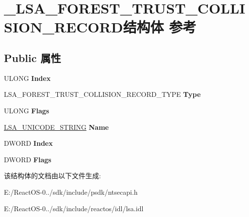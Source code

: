 \hypertarget{struct___l_s_a___f_o_r_e_s_t___t_r_u_s_t___c_o_l_l_i_s_i_o_n___r_e_c_o_r_d}{}\section{\+\_\+\+L\+S\+A\+\_\+\+F\+O\+R\+E\+S\+T\+\_\+\+T\+R\+U\+S\+T\+\_\+\+C\+O\+L\+L\+I\+S\+I\+O\+N\+\_\+\+R\+E\+C\+O\+R\+D结构体 参考}
\label{struct___l_s_a___f_o_r_e_s_t___t_r_u_s_t___c_o_l_l_i_s_i_o_n___r_e_c_o_r_d}
\subsection*{Public 属性}
\begin{DoxyCompactItemize}
\item 
\mbox{\label{struct___l_s_a___f_o_r_e_s_t___t_r_u_s_t___c_o_l_l_i_s_i_o_n___r_e_c_o_r_d_acf7bcb5a4216c97d4bce30af844413cf}} 
U\+L\+O\+NG {\bfseries Index}
\item 
\mbox{\label{struct___l_s_a___f_o_r_e_s_t___t_r_u_s_t___c_o_l_l_i_s_i_o_n___r_e_c_o_r_d_a8b14c0368af5bb54790c9113489095fc}} 
L\+S\+A\+\_\+\+F\+O\+R\+E\+S\+T\+\_\+\+T\+R\+U\+S\+T\+\_\+\+C\+O\+L\+L\+I\+S\+I\+O\+N\+\_\+\+R\+E\+C\+O\+R\+D\+\_\+\+T\+Y\+PE {\bfseries Type}
\item 
\mbox{\label{struct___l_s_a___f_o_r_e_s_t___t_r_u_s_t___c_o_l_l_i_s_i_o_n___r_e_c_o_r_d_a58e2e95ffcaa8e6e28136c9c302c1ad4}} 
U\+L\+O\+NG {\bfseries Flags}
\item 
\mbox{\label{struct___l_s_a___f_o_r_e_s_t___t_r_u_s_t___c_o_l_l_i_s_i_o_n___r_e_c_o_r_d_acee70d5ff12b04dbe04111db8ad79784}} 
\hyperlink{struct___l_s_a___u_n_i_c_o_d_e___s_t_r_i_n_g}{L\+S\+A\+\_\+\+U\+N\+I\+C\+O\+D\+E\+\_\+\+S\+T\+R\+I\+NG} {\bfseries Name}
\item 
\mbox{\label{struct___l_s_a___f_o_r_e_s_t___t_r_u_s_t___c_o_l_l_i_s_i_o_n___r_e_c_o_r_d_a13c47d0a1c717dab65a021bbde88d0cd}} 
D\+W\+O\+RD {\bfseries Index}
\item 
\mbox{\label{struct___l_s_a___f_o_r_e_s_t___t_r_u_s_t___c_o_l_l_i_s_i_o_n___r_e_c_o_r_d_a0878b033f355252cad6f2911c186c94c}} 
D\+W\+O\+RD {\bfseries Flags}
\end{DoxyCompactItemize}


该结构体的文档由以下文件生成\+:\begin{DoxyCompactItemize}
\item 
E\+:/\+React\+O\+S-\/0../sdk/include/psdk/ntsecapi.\+h\item 
E\+:/\+React\+O\+S-\/0../sdk/include/reactos/idl/lsa.\+idl\end{DoxyCompactItemize}
